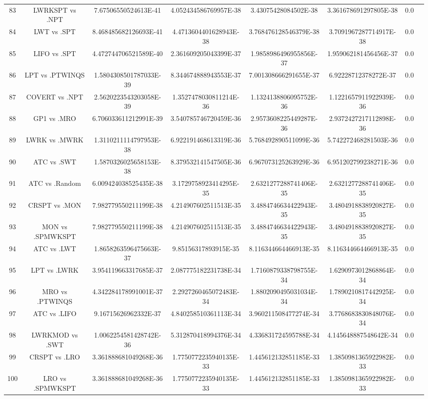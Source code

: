 \documentclass[a3paper,10pt]{article}
\begin{document}
\begin{table}[!htp]
\begin{tabular}{cccccccc}
83&LWRKSPT vs .NPT&7.67506550524613E-41&4.052434586769957E-38&3.43075428084502E-38&3.361678691297805E-38&0.0\\
84&LWT vs .SPT&8.468485682126693E-41&4.4713604401628943E-38&3.768476128546379E-38&3.7091967287714917E-38&0.0\\
85&LIFO vs .SPT&4.472744706521589E-40&2.361609205043399E-37&1.9858986496955856E-37&1.959062181456456E-37&0.0\\
86&LPT vs .PTWINQS&1.5804308501787033E-39&8.344674888943553E-37&7.001308666291655E-37&6.92228712378272E-37&0.0\\
87&COVERT vs .NPT&2.5620223543203058E-39&1.3527478030811214E-36&1.1324138806095752E-36&1.1221657911922939E-36&0.0\\
88&GP1 vs .MRO&6.706033611212991E-39&3.540785746720459E-36&2.9573608225449287E-36&2.9372427217112898E-36&0.0\\
89&LWRK vs .MWRK&1.3110211114797953E-38&6.922191468613319E-36&5.768492890511099E-36&5.742272468281503E-36&0.0\\
90&ATC vs .SWT&1.5870326025658153E-38&8.379532141547505E-36&6.967073125263929E-36&6.951202799238271E-36&0.0\\
91&ATC vs .Random&6.009424038525435E-38&3.1729758923414295E-35&2.6321277288741406E-35&2.6321277288741406E-35&0.0\\
92&CRSPT vs .MON&7.982779550211199E-38&4.214907602511513E-35&3.4884746634422943E-35&3.4804918838920827E-35&0.0\\
93&MON vs .SPMWKSPT&7.982779550211199E-38&4.214907602511513E-35&3.4884746634422943E-35&3.4804918838920827E-35&0.0\\
94&ATC vs .LWT&1.8658263596475663E-37&9.85156317893915E-35&8.116344664466913E-35&8.116344664466913E-35&0.0\\
95&LPT vs .LWRK&3.954119663317685E-37&2.087775182231738E-34&1.7160879338798755E-34&1.6290973012868864E-34&0.0\\
96&MRO vs .PTWINQS&4.342284178991001E-37&2.2927260465072483E-34&1.8802090495031034E-34&1.7890210817442925E-34&0.0\\
97&ATC vs .LIFO&9.16715626962332E-37&4.840258510361113E-34&3.960211508477274E-34&3.7768683830848076E-34&0.0\\
98&LWRKMOD vs .SWT&1.0062254581428742E-36&5.312870418994376E-34&4.336831724595788E-34&4.145648887548642E-34&0.0\\
99&CRSPT vs .LRO&3.361888681049268E-36&1.7750772235940135E-33&1.445612132851185E-33&1.3850981365922982E-33&0.0\\
100&LRO vs .SPMWKSPT&3.361888681049268E-36&1.7750772235940135E-33&1.445612132851185E-33&1.3850981365922982E-33&0.0\\

\end{tabular}
\end{table}
\end{document}

